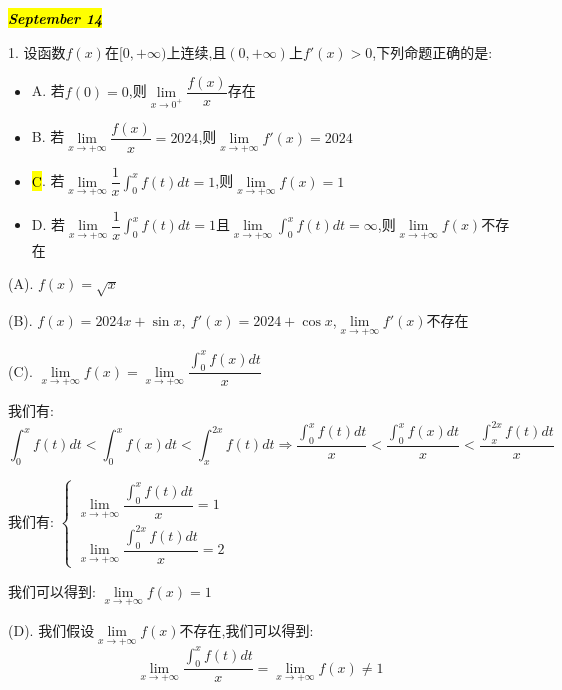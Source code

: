 \hl{\textbf{\textit{September 14}}}

1. 设函数$f(x)$在$[0,+\infty)$上连续,且$(0,+\infty)$上$f'(x)>0$,下列命题正确的是:  
\begin{itemize}
	\item A. 若$f(0)=0$,则$\lim\limits_{x\rightarrow 0^{+}}\dfrac{f(x)}{x}$存在
	\item B. 若$\lim\limits_{x\rightarrow+\infty}\dfrac{f(x)}{x}=2024$,则$\lim\limits_{x\rightarrow +\infty}f'(x)=2024$
	\item \hl{C}. 若$\lim\limits_{x\rightarrow+\infty}\dfrac{1}{x}\int_{0}^{x}f(t)dt=1$,则$\lim\limits_{x\rightarrow +\infty}f(x)=1$
	\item D. 若$\lim\limits_{x\rightarrow+\infty}\dfrac{1}{x}\int_{0}^{x}f(t)dt=1$且$\lim\limits_{x\rightarrow+\infty}\int_{0}^{x}f(t)dt=\infty$,则$\lim\limits_{x\rightarrow+\infty}f(x)$不存在
\end{itemize}
\begin{solution}

	(A). $f(x)=\sqrt{x}$
	
	(B). $f(x)=2024x+\sin x,\ f'(x)=2024+\cos x$,$\lim\limits_{x\rightarrow +\infty}f'(x)\text{不存在}$
	
	(C). $\lim\limits_{x\rightarrow +\infty}f(x)=\lim\limits_{x\rightarrow+\infty}\dfrac{\int_{0}^{x}f(x)dt}{x}$
	
	我们有:  $$\int_{0}^{x}f(t)dt<\int_{0}^{x}f(x)dt<\int_{x}^{2x}f(t)dt\Rightarrow \dfrac{\int_{0}^{x}f(t)dt}{x}<\dfrac{\int_{0}^{x}f(x)dt}{x}<\dfrac{\int_{x}^{2x}f(t)dt}{x}$$
	
	我们有:  $\left\lbrace
	\begin{array}{l}
		\lim\limits_{x\rightarrow+\infty}\dfrac{\int_{0}^{x}f(t)dt}{x}=1\\
		\lim\limits_{x\rightarrow+\infty}\dfrac{\int_{0}^{2x}f(t)dt}{x}=2
	\end{array}
	\right. $
	
	我们可以得到:  $\lim\limits_{x\rightarrow +\infty}f(x)=1$
	
	(D). 我们假设$\lim\limits_{x\rightarrow +\infty}f(x)$不存在,我们可以得到:  
	$$\lim\limits_{x\rightarrow +\infty}\dfrac{\int_{0}^{x}f(t)dt}{x}=\lim\limits_{x\rightarrow+\infty}f(x)\neq 1$$
	
\end{solution}

